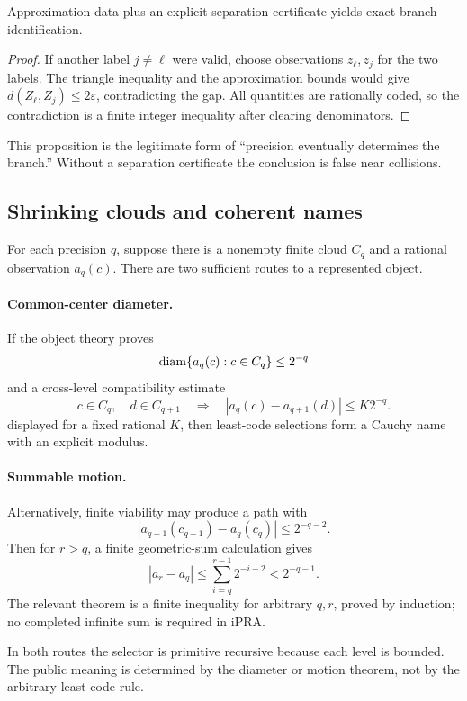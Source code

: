 \begin{proposition}
Approximation data plus an explicit separation certificate yields exact branch identification.
\end{proposition}
\begin{proof}
If another label \(j\ne\ell\) were valid, choose observations \(z_\ell,z_j\) for the two labels.  The
triangle inequality and the approximation bounds would give
\(d(Z_\ell,Z_j)\le 2\varepsilon\), contradicting the gap.  All quantities are rationally coded, so the
contradiction is a finite integer inequality after clearing denominators.
\end{proof}

This proposition is the legitimate form of ``precision eventually determines the branch.''  Without a
separation certificate the conclusion is false near collisions.

\subsection{Shrinking clouds and coherent names}

For each precision \(q\), suppose there is a nonempty finite cloud \(C_q\) and a rational observation
\(a_q(c)\).  There are two sufficient routes to a represented object.

\paragraph{Common-center diameter.}
If the object theory proves
\[
 \operatorname{diam}\{a_q(c):c\in C_q\}\le 2^{-q}
\]
and a cross-level compatibility estimate
\[
 c\in C_q,\quad d\in C_{q+1}
 \quad\Longrightarrow\quad
 |a_q(c)-a_{q+1}(d)|\le K2^{-q}.
\]
displayed for a fixed rational \(K\), then least-code selections form a Cauchy name with an explicit
modulus.

\paragraph{Summable motion.}
Alternatively, finite viability may produce a path with
\[
 |a_{q+1}(c_{q+1})-a_q(c_q)|\le 2^{-q-2}.
\]
Then for \(r>q\), a finite geometric-sum calculation gives
\[
 |a_r-a_q|\le \sum_{i=q}^{r-1}2^{-i-2}<2^{-q-1}.
\]
The relevant theorem is a finite inequality for arbitrary \(q,r\), proved by induction; no completed
infinite sum is required in iPRA.

In both routes the selector is primitive recursive because each level is bounded.  The public meaning is
determined by the diameter or motion theorem, not by the arbitrary least-code rule.

